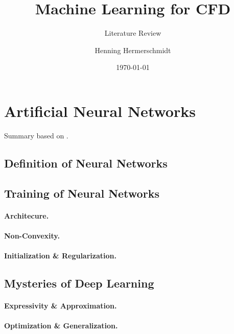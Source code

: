 \documentclass[a4paper, pagesize, DIV=15,
               12pt, parskip=full,
               bibliography=totocnumbered]{scrartcl}
\begin{document}
\title{Machine Learning for CFD}
\subtitle{Literature Review}
\author{Henning Hermerschmidt}
\date{\today}
\maketitle




\section{Artificial Neural Networks}
Summary based on \cite{Genzel2019}.

\subsection{Definition of Neural Networks}

\subsection{Training of Neural Networks}

\paragraph{Architecure.}

\paragraph{Non-Convexity.}

\paragraph{Initialization \& Regularization.}

\subsection{Mysteries of Deep Learning}

\paragraph{Expressivity \& Approximation.}

\paragraph{Optimization \& Generalization.}
\end{document}
